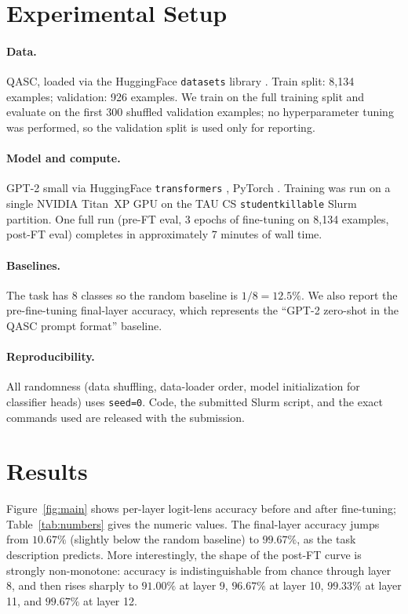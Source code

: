\documentclass[11pt]{article}
\begin{document}
\section{Experimental Setup}

\paragraph{Data.} QASC, loaded via the HuggingFace \texttt{datasets} library
\citep{lhoest2021datasets}. Train split: 8{,}134 examples; validation:
926 examples. We train on the full training split and evaluate on the first
300 shuffled validation examples; no hyperparameter tuning was performed, so
the validation split is used only for reporting.

\paragraph{Model and compute.} GPT-2 small via HuggingFace
\texttt{transformers} \citep{wolf2020transformers}, PyTorch
\citep{paszke2019pytorch}. Training was run on a single NVIDIA Titan~XP GPU on
the TAU CS \texttt{studentkillable} Slurm partition. One full run
(pre-FT eval, 3 epochs of fine-tuning on 8{,}134 examples, post-FT eval)
completes in approximately 7 minutes of wall time.

\paragraph{Baselines.} The task has 8 classes so the random baseline is
$1/8 = 12.5\%$. We also report the pre-fine-tuning final-layer accuracy, which
represents the ``GPT-2 zero-shot in the QASC prompt format'' baseline.

\paragraph{Reproducibility.} All randomness (data shuffling, data-loader
order, model initialization for classifier heads) uses \texttt{seed=0}. Code,
the submitted Slurm script, and the exact commands used are released with the
submission.

\section{Results}

Figure~\ref{fig:main} shows per-layer logit-lens accuracy before and after
fine-tuning; Table~\ref{tab:numbers} gives the numeric values. The final-layer
accuracy jumps from $10.67\%$ (slightly below the random baseline) to
$99.67\%$, as the task description predicts. More interestingly, the shape of
the post-FT curve is strongly non-monotone: accuracy is indistinguishable from
chance through layer 8, and then rises sharply to $91.00\%$ at layer 9,
$96.67\%$ at layer 10, $99.33\%$ at layer 11, and $99.67\%$ at layer 12.
\end{document}
